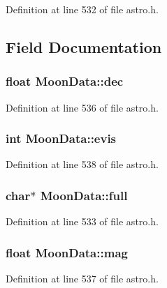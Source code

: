 Definition at line 532 of file astro.\-h.



\subsection{Field Documentation}
\hypertarget{struct_moon_data_a621f6392fbcb83e989409e8be3568282}{
\subsubsection[{dec}]{\setlength{\rightskip}{0pt plus 5cm}float Moon\-Data\-::dec}}\label{struct_moon_data_a621f6392fbcb83e989409e8be3568282}


Definition at line 536 of file astro.\-h.

\hypertarget{struct_moon_data_a24226b259db68849973b400bf537ea9b}{
\subsubsection[{evis}]{\setlength{\rightskip}{0pt plus 5cm}int Moon\-Data\-::evis}}\label{struct_moon_data_a24226b259db68849973b400bf537ea9b}


Definition at line 538 of file astro.\-h.

\hypertarget{struct_moon_data_aa024691b4ac16b92266ab38a60f577de}{
\subsubsection[{full}]{\setlength{\rightskip}{0pt plus 5cm}char$\ast$ Moon\-Data\-::full}}\label{struct_moon_data_aa024691b4ac16b92266ab38a60f577de}


Definition at line 533 of file astro.\-h.

\hypertarget{struct_moon_data_ab42a1f4af07b83748607e1a27f8ddb3a}{
\subsubsection[{mag}]{\setlength{\rightskip}{0pt plus 5cm}float Moon\-Data\-::mag}}\label{struct_moon_data_ab42a1f4af07b83748607e1a27f8ddb3a}


Definition at line 537 of file astro.\-h.

